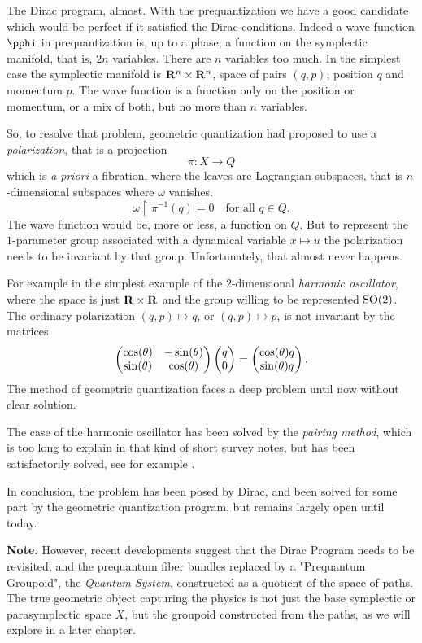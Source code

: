 \begin{Article}{The Dirac program, almost.}{}
  With the prequantization we have a good candidate which would be perfect if it satisfied the Dirac conditions.
  Indeed a wave function $\pphi$ in prequantization is,
  up to a phase,
  a function on the symplectic manifold,
  that is,
  $2n$ variables.
  There are $n$ variables too much.
  In the simplest case the symplectic manifold is $\mathbf{R}^n \times \mathbf{R}^n$,
  space of pairs $(q,p)$,
  position $q$ and momentum $p$.
  The wave function is a function only on the position or momentum,
  or a mix of both,
  but no more than $n$ variables.
  
  So,
  to resolve that problem,
  geometric quantization had proposed to use a \emph{polarization},
  that is a projection
  $$%
    \pi \colon X \to Q
    $$%
  which is {\em a priori} a  fibration,
  where the leaves are Lagrangian subspaces,
  that is $n$-dimensional subspaces where $\omega$ vanishes.
  $$%
    \omega \restriction \pi^{-1}(q) = 0 \quad \text{for all $q \in Q$}.
    $$%
  The wave function would be,
  more or less,
  a function on $Q$.
  But to represent the $1$-parameter group associated with a dynamical variable $x \mapsto u$ the polarization needs to be invariant by that group.
  Unfortunately,
  that almost never happens.
  
  For example in the simplest example of the $2$-dimensional \emph{harmonic oscillator},
  where the space is just $\mathbf{R} \times \mathbf{R}$ and the group willing to be represented $\mathrm{SO}(2)$.
  The ordinary polarization $(q,p)\mapsto q$,
  or $(q,p)\mapsto p$,
  is not invariant by the matrices
  $$%
    \Vector{\cos(\theta) & -\sin(\theta) \\ \sin(\theta) & \cos(\theta)}\Vector{q \\ 0} = \Vector{\cos(\theta) q  \\ \sin(\theta) q }.
    $$%
  The method of geometric quantization faces a deep problem until now without clear solution.
  
  The case of the harmonic oscillator has been solved by the \emph{pairing method},
  which is too long to explain in that kind of short survey notes,
  but has been satisfactorily solved,
  see for example \cite{Sou75}.
  
  In conclusion,
  the problem has been posed by Dirac,
  and been solved for some part by the geometric quantization program,
  but remains largely open until today.
  
\textbf{Note.} However,
  recent developments suggest that the Dirac Program needs to be revisited,
  and the prequantum fiber bundles replaced by a "Prequantum Groupoid",
  the \emph{Quantum System},
  constructed as a quotient of the space of paths.
  The true geometric object capturing the physics is not just the base symplectic or parasymplectic space $X$,
  but the groupoid constructed from the paths,
  as we will explore in a later chapter.
  
\end{Article}



